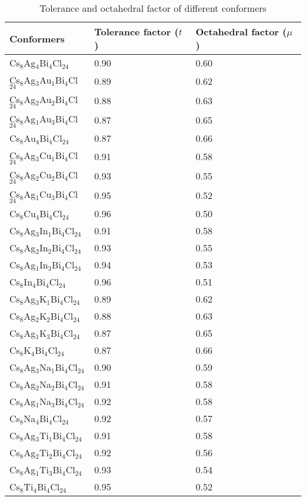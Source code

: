 \documentclass[journal=jpclcd,manuscript=letter]{achemso}
\begin{document}
\begin{longtable}{p{4.2cm} p{2.0cm}p{2.0cm}} 
		\caption{Tolerance and octahedral factor of different conformers}\\ \hline
		Conformers & Tolerance factor ($t$) & Octahedral factor ($\mu$) \\ \hline 
		Cs$_8$Ag$_4$Bi$_4$Cl$_{24}$& 0.90 &0.60 \\ \hline
		Cs$_8$Ag$_3$Au$_1$Bi$_4$Cl$_{24}$&0.89 &0.62\\ \hline
		Cs$_8$Ag$_2$Au$_2$Bi$_4$Cl$_{24}$& 0.88 &0.63\\ \hline
		Cs$_8$Ag$_1$Au$_3$Bi$_4$Cl$_{24}$&0.87& 0.65\\ \hline
		Cs$_8$Au$_4$Bi$_4$Cl$_{24}$&0.87 &0.66\\ \hline
		Cs$_8$Ag$_3$Cu$_1$Bi$_4$Cl$_{24}$&0.91& 0.58\\ \hline
		Cs$_8$Ag$_2$Cu$_2$Bi$_4$Cl$_{24}$&0.93& 0.55\\ \hline
		Cs$_8$Ag$_1$Cu$_3$Bi$_4$Cl$_{24}$&0.95 &0.52\\ \hline
		Cs$_8$Cu$_4$Bi$_4$Cl$_{24}$&0.96 &0.50\\ \hline
		Cs$_8$Ag$_3$In$_1$Bi$_4$Cl$_{24}$&0.91 & 0.58\\ \hline
		Cs$_8$Ag$_2$In$_2$Bi$_4$Cl$_{24}$&0.93 &0.55\\ \hline
		Cs$_8$Ag$_1$In$_3$Bi$_4$Cl$_{24}$&0.94&0.53\\ \hline
		Cs$_8$In$_4$Bi$_4$Cl$_{24}$&0.96 &0.51\\ \hline
		Cs$_8$Ag$_3$K$_1$Bi$_4$Cl$_{24}$&0.89 &0.62\\ \hline
		Cs$_8$Ag$_2$K$_2$Bi$_4$Cl$_{24}$&0.88 &0.63\\ \hline
		Cs$_8$Ag$_1$K$_3$Bi$_4$Cl$_{24}$&0.87 &0.65\\ \hline
		Cs$_8$K$_4$Bi$_4$Cl$_{24}$&0.87 &0.66\\ \hline
		Cs$_8$Ag$_3$Na$_1$Bi$_4$Cl$_{24}$&0.90 &0.59\\ \hline
		Cs$_8$Ag$_2$Na$_2$Bi$_4$Cl$_{24}$&0.91 &0.58\\ \hline
		Cs$_8$Ag$_1$Na$_3$Bi$_4$Cl$_{24}$&0.92 &0.58\\ \hline
		Cs$_8$Na$_4$Bi$_4$Cl$_{24}$&0.92 &0.57\\ \hline
		Cs$_8$Ag$_3$Ti$_1$Bi$_4$Cl$_{24}$&0.91 &0.58\\ \hline
		Cs$_8$Ag$_2$Ti$_2$Bi$_4$Cl$_{24}$&0.92 &0.56\\ \hline
		Cs$_8$Ag$_1$Ti$_3$Bi$_4$Cl$_{24}$&0.93  &0.54\\ \hline
		Cs$_8$Ti$_4$Bi$_4$Cl$_{24}$&0.95 &0.52\\ \hline

\end{longtable}
\end{document}
